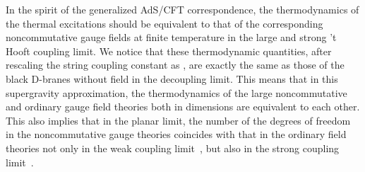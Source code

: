 \documentclass[a4paper,12pt]{article}
\begin{document}
In the spirit of the generalized AdS/CFT correspondence, the thermodynamics
of the thermal excitations should be equivalent to that of the corresponding
noncommutative gauge fields at finite temperature \coordHE{} in the large \coordHE{}
and strong 't Hooft coupling limit. We notice that these thermodynamic
quantities, after rescaling the string coupling constant as
\coordHE{}, are exactly the same as those of the black
D\coordHE{}-branes without \coordHE{} field in the decoupling limit. This means that in
this supergravity approximation, the thermodynamics of the large \coordHE{}
noncommutative and ordinary gauge field theories both in \coordHE{} dimensions
are equivalent to each other. This also
implies that in the planar limit, the number of the degrees of freedom in
the noncommutative gauge theories coincides with that in the ordinary field
theories not only in the weak coupling limit~\cite{BS}, but also in the
strong coupling limit~\cite{Mald1,Ali,Bar,Harmark}.
\end{document}
